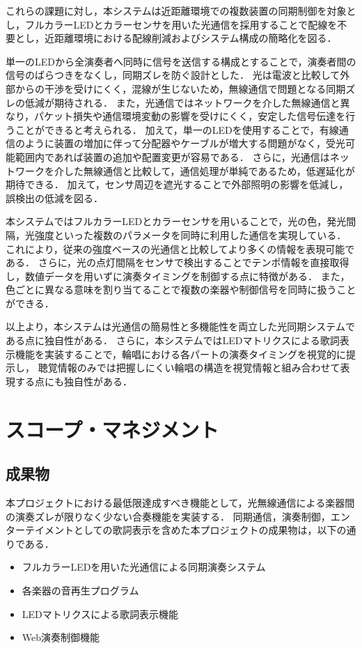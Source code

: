 \documentclass[lualatex,book,openany,paper=a4paper,jafontsize=11.5pt,jafontscale=1.05]{jlreq}
\begin{document}
これらの課題に対し，本システムは近距離環境での複数装置の同期制御を対象とし，フルカラーLEDとカラーセンサを用いた光通信を採用することで配線を不要とし，近距離環境における配線削減およびシステム構成の簡略化を図る．


単一のLEDから全演奏者へ同時に信号を送信する構成とすることで，演奏者間の信号のばらつきをなくし，同期ズレを防ぐ設計とした．
光は電波と比較して外部からの干渉を受けにくく，混線が生じないため，無線通信で問題となる同期ズレの低減が期待される．
また，光通信ではネットワークを介した無線通信と異なり，パケット損失や通信環境変動の影響を受けにくく，安定した信号伝達を行うことができると考えられる．
加えて，単一のLEDを使用することで，有線通信のように装置の増加に伴って分配器やケーブルが増大する問題がなく，受光可能範囲内であれば装置の追加や配置変更が容易である．
さらに，光通信はネットワークを介した無線通信と比較して，通信処理が単純であるため，低遅延化が期待できる．
加えて，センサ周辺を遮光することで外部照明の影響を低減し，誤検出の低減を図る．

本システムではフルカラーLEDとカラーセンサを用いることで，光の色，発光間隔，光強度といった複数のパラメータを同時に利用した通信を実現している．
これにより，従来の強度ベースの光通信と比較してより多くの情報を表現可能である．
さらに，光の点灯間隔をセンサで検出することでテンポ情報を直接取得し，数値データを用いずに演奏タイミングを制御する点に特徴がある．
また，色ごとに異なる意味を割り当てることで複数の楽器や制御信号を同時に扱うことができる．


以上より，本システムは光通信の簡易性と多機能性を両立した光同期システムである点に独自性がある．
さらに，本システムではLEDマトリクスによる歌詞表示機能を実装することで，輪唱における各パートの演奏タイミングを視覚的に提示し，
聴覚情報のみでは把握しにくい輪唱の構造を視覚情報と組み合わせて表現する点にも独自性がある．
\section{スコープ・マネジメント}

\subsection{成果物}
本プロジェクトにおける最低限達成すべき機能として，光無線通信による楽器間の演奏ズレが限りなく少ない合奏機能を実装する．
同期通信，演奏制御，エンターテイメントとしての歌詞表示を含めた本プロジェクトの成果物は，以下の通りである．
\begin{itemize}
\item フルカラーLEDを用いた光通信による同期演奏システム
\item 各楽器の音再生プログラム
\item LEDマトリクスによる歌詞表示機能
\item Web演奏制御機能
\end{itemize}
\end{document}
